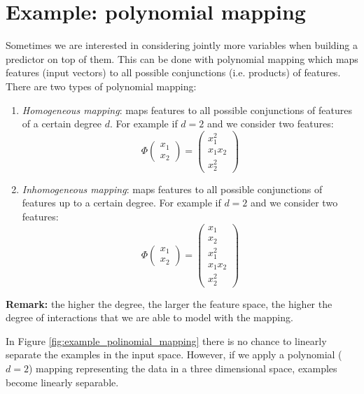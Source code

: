 \section{Example: polynomial mapping}
Sometimes we are interested in considering jointly more variables when building a
predictor on top of them. This can be done with polynomial mapping which maps
features (input vectors) to all possible conjunctions (i.e. products) of features.
There are two types of polynomial mapping:
\begin{enumerate}
	\item \textit{Homogeneous mapping}: maps features to all possible conjunctions
		of features of a certain degree $d$. For example if $d=2$ and we consider
		two features:
		\[
			\Phi(
			\begin{matrix}
				x_{1} \\
				x_{2}
			\end{matrix}) =
			\begin{pmatrix}
				x_{1}^{2}  \\
				x_{1}x_{2} \\
				x_{2}^{2}
			\end{pmatrix}
		\]

	\item \textit{Inhomogeneous mapping}: maps features to all possible conjunctions
		of features up to a certain degree. For example if $d=2$ and we consider two
		features:
		\[
			\Phi(
			\begin{matrix}
				x_{1} \\
				x_{2}
			\end{matrix}) =
			\begin{pmatrix}
				x_{1}      \\
				x_{2}      \\
				x_{1}^{2}  \\
				x_{1}x_{2} \\
				x_{2}^{2}
			\end{pmatrix}
		\]
\end{enumerate}

\textbf{Remark:} the higher the degree, the larger the feature space, the higher
the degree of interactions that we are able to model with the mapping.
\newline

In Figure \ref{fig:example_polinomial_mapping} there is no chance to linearly separate
the examples in the input space. However, if we apply a polynomial ($d=2$) mapping
representing the data in a three dimensional space, examples become linearly
separable.
\newline

